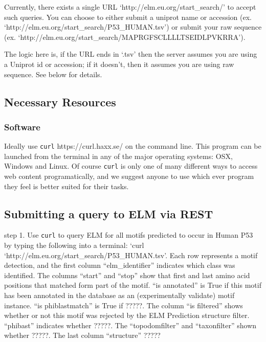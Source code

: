 Currently, there exists a single URL `http://elm.eu.org/start\_search/'
to accept such queries. You can choose to either submit a uniprot name
or accession (ex. `http://elm.eu.org/start\_search/P53\_HUMAN.tsv') or
submit your raw sequence (ex.
`http://elm.eu.org/start\_search/MAPRGFSCLLLLTSEIDLPVKRRA').

The logic here is, if the URL ends in `.tsv' then the server assumes you
are using a Uniprot id or accession; if it doesn't, then it assumes you
are using raw sequence. See below for details.

\subsection{Necessary Resources}\label{necessary-resources-2}

\subsubsection{Software}\label{software}

Ideally use \texttt{curl} https://curl.haxx.se/ on the command line.
This program can be launched from the terminal in any of the major
operating systems: OSX, Windows and Linux. Of course \texttt{curl} is
only one of many different ways to access web content programatically,
and we suggest anyone to use which ever program they feel is better
suited for their tasks.

\subsection{Submitting a query to ELM via
REST}\label{submitting-a-query-to-elm-via-rest}

step 1. Use \texttt{curl} to query ELM for all motifs predicted to occur
in Human P53 by typing the following into a terminal: `curl
`http://elm.eu.org/start\_search/P53\_HUMAN.tsv'. Each row represents a
motif detection, and the first column ``elm\_identifier'' indicates
which class was identified. The columns ``start'' and ``stop'' show that
first and last amino acid positions that matched form part of the motif.
``is annotated'' is True if this motif has been annotated in the
database as an (experimentally validate) motif instance. ``is
phiblastmatch'' is True if ?????. The column ``is filtered'' shows
whether or not this motif was rejected by the ELM Prediction structure
filter. ``phibast'' indicates whether ?????. The ``topodomfilter'' and
``taxonfilter'' shown whether ?????. The last column ``structure'' ?????

